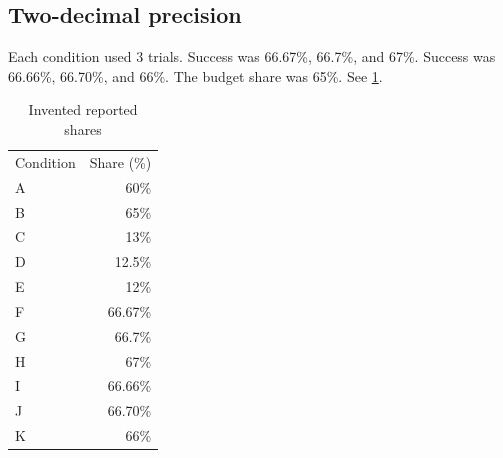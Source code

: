 \subsection{Two-decimal precision}
Each condition used 3 trials.
Success was 66.67\%, 66.7\%, and 67\%.
Success was 66.66\%, 66.70\%, and 66\%.
The budget share was 65\%.
See \ref{tab:values}.
\begin{table}\caption{Invented reported shares}\label{tab:values}
\begin{tabular}{lr}
Condition & Share (\%) \\
A & 60\% \\ B & 65\% \\ C & 13\% \\ D & 12.5\% \\ E & 12\% \\
F & 66.67\% \\ G & 66.7\% \\ H & 67\% \\ I & 66.66\% \\ J & 66.70\% \\ K & 66\% \\
\end{tabular}\end{table}
\nocite{*}
